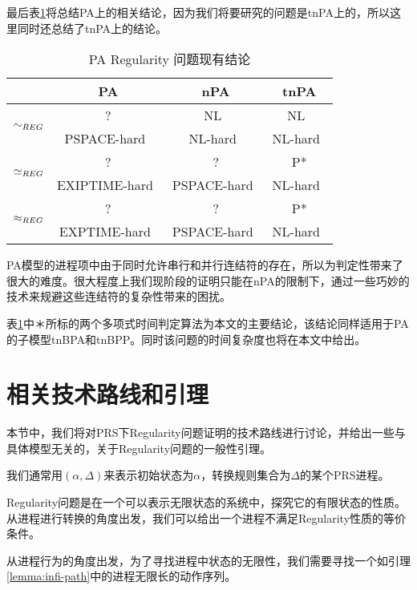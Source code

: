 最后表\ref{tab:pa-reg}将总结PA上的相关结论，因为我们将要研究的问题是tnPA上的，所以这里同时还总结了tnPA上的结论。

\begin{table}[htbp]
\begin{center}
\begin{tabular}{|c|c|c|c|}
\hline
	&PA	&nPA	&tnPA\\
\hline
\hline
\multirow{2}{*}{$\sim_{REG}$} &
 ? &NL~\cite{Kucera1996} &NL~\cite{Kucera1996} \\
& PSPACE-hard~\cite{Srba2002a} & NL-hard~\cite{Srba2002a} & NL-hard~\cite{Srba2002a}\\
\hline
\multirow{2}{*}{$\simeq_{REG}$} &
 ? & ? &P* \\
& EXIPTIME-hard~\cite{Mayr2003} & PSPACE-hard~\cite{Srba2003} & NL-hard~\cite{Srba2002a}\\
\hline
\multirow{2}{*}{$\approx_{REG}$} &
 ? & ? &P* \\
& EXPTIME-hard~\cite{Mayr2003} & PSPACE-hard~\cite{Srba2003} & NL-hard~\cite{Srba2002a}\\
\hline
\end{tabular}
\caption{\textsf{PA} Regularity 问题现有结论}
\label{tab:pa-reg}
\end{center}
\end{table}
PA模型的进程项中由于同时允许串行和并行连结符的存在，所以为判定性带来了很大的难度。很大程度上我们现阶段的证明只能在nPA的限制下，通过一些巧妙的技术来规避这些连结符的复杂性带来的困扰。

表\ref{tab:pa-reg}中＊所标的两个多项式时间判定算法为本文的主要结论，该结论同样适用于PA的子模型tnBPA和tnBPP。同时该问题的时间复杂度也将在本文中给出。

\section{相关技术路线和引理}
\label{sec:lemma}

本节中，我们将对PRS下Regularity问题证明的技术路线进行讨论，并给出一些与具体模型无关的，关于Regularity问题的一般性引理。

我们通常用$(\alpha,\Delta)$来表示初始状态为$\alpha$，转换规则集合为$\Delta$的某个PRS进程。

Regularity问题是在一个可以表示无限状态的系统中，探究它的有限状态的性质。从进程进行转换的角度出发，我们可以给出一个进程不满足Regularity性质的等价条件。

从进程行为的角度出发，为了寻找进程中状态的无限性，我们需要寻找一个如引理\ref{lemma:infi-path}中的进程无限长的动作序列。

